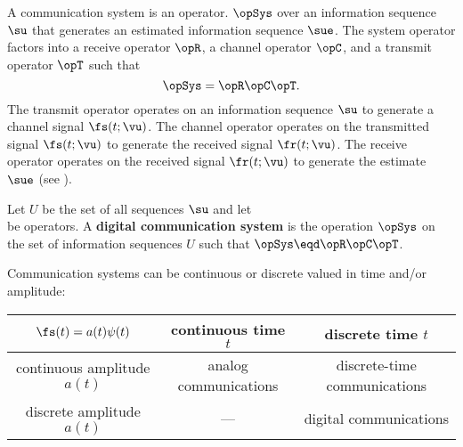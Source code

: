 A communication system is an operator.
$\opSys$ over an information sequence $\su$ that generates an
estimated information sequence $\sue$.
The system operator factors into a
receive operator $\opR$, a channel operator $\opC$, and
a transmit operator $\opT$ such that
   \[ \opSys = \opR\opC\opT. \]
The transmit operator
operates on an information sequence $\su$ to generate
a channel signal $\fs(t;\vu)$.
The channel operator operates on the transmitted signal $\fs(t;\vu)$
to generate the received signal $\fr(t;\vu)$.
The receive operator operates on the received signal $\fr(t;\vu)$
to generate the estimate $\sue$
(see ).


\begin{definition}
\label{def:comsys}
Let $U$ be the set of all sequences $\su$ and let
\\
be operators.
A {\bf digital communication system} is the operation $\opSys$
on the set of information sequences $U$ such that
$\opSys \eqd \opR\opC\opT$.
\end{definition}

Communication systems can be continuous or discrete valued in
time and/or amplitude:

   \begin{tabular}{|c||c|c|}
      \hline
         $\fs(t)=a(t)\psi(t)$   &  continuous time $t$      & discrete time $t$   \\
      \hline
      \hline
         continuous amplitude $a(t)$ & analog communications   & discrete-time communications  \\
      \hline
         discrete amplitude $a(t)$   &---                    & digital communications \\
      \hline
   \end{tabular}

